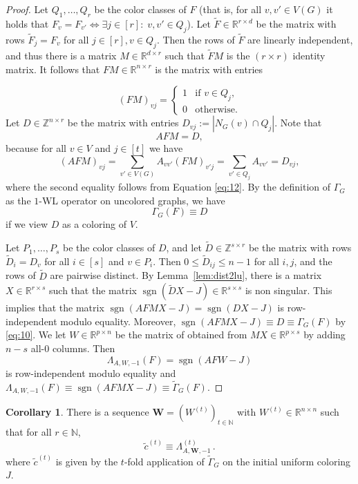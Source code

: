 \documentclass[letterpaper]{article}
\theoremstyle{definition}
\newtheorem{corollary}[theorem]{Corollary}
\newcommand{\RR}{\mathbb{R}}
\newcommand{\ZZ}{\mathbb{Z}}
\newcommand{\NN}{\mathbb{N}}
\renewcommand{\vec}[1]{\mathbf{#1}} %
\newcommand{\sgn}{\operatorname{sgn}}
\begin{document}
\begin{proof}
	Let $Q_1,\ldots,Q_r$ be the color
	classes of $F$ (that is, for all $v,v'\in V(G)$ it holds that
	$F_{v}=F_{v'}\iff\exists j\in[r]:\; v,v'\in Q_j$). Let
	$\tilde F\in\RR^{r\times d}$ be the matrix with rows $\tilde
	F_{j}=F_{v}$ for all $j\in[r], v\in Q_j$. Then the rows of $\tilde
	F$ are linearly independent, and thus there is a matrix 
	$M\in\RR^{d\times r}$ such that $\tilde FM$ is the $(r\times r)$ identity
	matrix. 
	It follows that $FM\in\RR^{n\times r}$ is the matrix with entries
		
	\begin{equation}
		\label{eq:12}
		(FM)_{vj}=
		\begin{cases}
			1 & \text{if }v\in Q_j, \\
			0 & \text{otherwise}.   
		\end{cases}
	\end{equation}
	Let $D\in\ZZ^{n\times r}$ be
	the matrix with entries $D_{vj}:=|N_G(v)\cap Q_j|$. Note that
	\begin{equation}
		\label{eq:13}
		AFM=D,
	\end{equation}
	because for all $v\in V$ and $j\in[t]$ we have
	\[
		(AFM)_{vj}=\sum_{v'\in V(G)}A_{vv'}(FM)_{v'j}
		= \sum_{v'\in Q_j}A_{vv'}=D_{vj},
	\]
	where the second equality follows from Equation \eqref{eq:12}. By the definition of $\Gamma_G$ as the $1$-WL operator on uncolored graphs, we have
	\begin{equation}
		\label{eq:10}
		\Gamma_G(F)\equiv D
	\end{equation}
	if we view $D$ as a coloring of $V$.
				
	Let $P_1,\ldots,P_s$ be the color classes of $D$, and let $\tilde D\in\ZZ^{s\times r}$ be the matrix
	with rows $\tilde D_{i}=D_{v}$ for all $i\in[s]$ and $v\in
	P_i$. Then $0\le\tilde D_{ij}\le n-1$ for all $i,j$, and the rows of
	$\tilde D$ are pairwise distinct. By Lemma~\ref{lem:dist2lu}, there is a
	matrix $X\in\RR^{r\times s}$ such that the matrix
	$\sgn(\tilde DX-J)\in\RR^{s\times s}$ is non singular. This implies
	that the matrix $\sgn(AFMX-J)=\sgn(DX-J)$ is row-independent modulo
	equality. Moreover, $\sgn(AFMX-J)\equiv D\equiv \Gamma_G(F)$ by \eqref{eq:10}. We let $W\in\RR^{p\times n}$ be the matrix of obtained from
	$MX\in\RR^{p\times s}$ by adding $n-s$ all-0 columns. Then 
	\[
		\Lambda_{A,W,-1}(F)=\sgn(AFW-J)
	\]
	is row-independent modulo equality and
	$\Lambda_{A,W,-1}(F)\equiv\sgn(AFMX-J)\equiv \tilde\Gamma_G(F)$. 
\end{proof}
\begin{corollary}
	There is a sequence $\vec W=(W^{(t)})_{t\in\NN}$ with
	$W^{(t)}\in \RR^{n\times n}$ such that for all $r\in\NN$,
	\[
		\tilde c^{(t)}\equiv \Lambda_{A,\vec W,-1}^{(t)}\,.
	\]
	where $\tilde c^{(t)}$ is given by the $t$-fold application of $\tilde\Gamma_G$ on the initial uniform coloring $J$.
\end{corollary}
\end{document}
